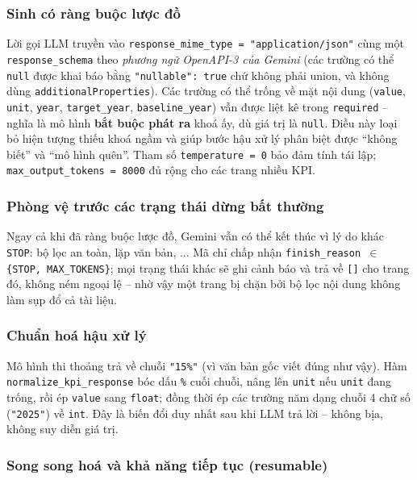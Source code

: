 \documentclass{article}
\begin{document}
\subsubsection{Sinh có ràng buộc lược đồ}

Lời gọi LLM truyền vào \texttt{response\_mime\_type = "application/json"} cùng
một \texttt{response\_schema} theo \textit{phương ngữ OpenAPI-3 của Gemini} (các
trường có thể \texttt{null} được khai báo bằng \texttt{"nullable": true} chứ
không phải union, và không dùng \texttt{additionalProperties}). Các trường có
thể trống về mặt nội dung (\texttt{value}, \texttt{unit}, \texttt{year},
\texttt{target\_year}, \texttt{baseline\_year}) vẫn được liệt kê trong
\texttt{required} -- nghĩa là mô hình \textbf{bắt buộc phát ra} khoá ấy, dù giá
trị là \texttt{null}. Điều này loại bỏ hiện tượng thiếu khoá ngầm và giúp bước
hậu xử lý phân biệt được ``không biết'' và ``mô hình quên''. Tham số
\texttt{temperature = 0} bảo đảm tính tái lập;
\texttt{max\_output\_tokens = 8000} đủ rộng cho các trang nhiều KPI.

\subsubsection{Phòng vệ trước các trạng thái dừng bất thường}

Ngay cả khi đã ràng buộc lược đồ, Gemini vẫn có thể kết thúc vì lý do khác
\texttt{STOP}: bộ lọc an toàn, lặp văn bản, ... Mã chỉ chấp nhận
\texttt{finish\_reason $\in$ \{STOP, MAX\_TOKENS\}}; mọi trạng thái khác sẽ ghi
cảnh báo và trả về \texttt{[]} cho trang đó, không ném ngoại lệ -- nhờ vậy một
trang bị chặn bởi bộ lọc nội dung không làm sụp đổ cả tài liệu.

\subsubsection{Chuẩn hoá hậu xử lý}

Mô hình thi thoảng trả về chuỗi \texttt{"15\%"} (vì văn bản gốc viết đúng như
vậy). Hàm \texttt{normalize\_kpi\_response} bóc dấu \texttt{\%} cuối chuỗi,
nâng lên \texttt{unit} nếu \texttt{unit} đang trống, rồi ép \texttt{value} sang
\texttt{float}; đồng thời ép các trường năm dạng chuỗi 4 chữ số (\texttt{"2025"})
về \texttt{int}. Đây là biến đổi duy nhất sau khi LLM trả lời -- không bịa,
không suy diễn giá trị.

\subsubsection{Song song hoá và khả năng tiếp tục (resumable)}
\end{document}

